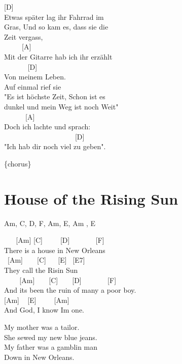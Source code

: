 \documentclass[
  letterpaper,
  twoside=false]{scrbook}
\begin{document}
{[}D{]}\\
Etwas später lag ihr Fahrrad im\\
Gras, Und so kam es, dass sie die\\
Zeit vergass,\\
\hspace*{0.333em} ~ ~ ~ {[}A{]}\\
Mit der Gitarre hab ich ihr erzählt\\
\hspace*{0.333em} ~ ~ ~ ~ {[}D{]}\\
Von meinem Leben.\\
Auf einmal rief sie\\
"Es ist höchste Zeit, Schon ist es\\
dunkel und mein Weg ist noch Weit"\\
\hspace*{0.333em} ~ ~ ~ ~{[}A{]}\\
Doch ich lachte und sprach:\\
\hspace*{0.333em} ~ ~ ~ ~ ~ ~ ~ ~ ~ ~ ~ ~ {[}D{]}\\
"Ich hab dir noch viel zu geben".

\{chorus\}

\hypertarget{house-of-the-rising-sun}{%
\chapter{House of the Rising Sun}\label{house-of-the-rising-sun}}

Am, C, D, F, Am, E, Am , E

~ ~ {[}Am{]} {[}C{]} ~ ~ ~{[}D{]} ~ ~ ~ ~ {[}F{]}\\
There is a house in New Orleans\\
\hspace*{0.333em} ~{[}Am{]} ~ ~ {[}C{]} ~ ~{[}E{]} ~{[}E7{]}\\
They call the Risin\textquotesingle{} Sun\\
\hspace*{0.333em} ~ ~ ~{[}Am{]} ~ ~ {[}C{]} ~ ~ {[}D{]} ~ ~ ~ ~
{[}F{]}\\
And it\textquotesingle s been the ruin of many a poor boy.\\
\hspace*{0.333em} {[}Am{]} ~ {[}E{]} ~ ~ ~{[}Am{]}\\
And God, I know I\textquotesingle m one.

My mother was a tailor.\\
She sewed my new blue jeans.\\
My father was a gamblin\textquotesingle{} man\\
Down in New Orleans.
\end{document}
